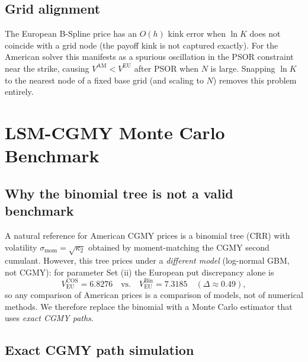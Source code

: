 \documentclass[11pt,a4paper]{article}
\begin{document}
\subsection{Grid alignment}

The European B-Spline price has an $O(h)$ kink error when $\ln K$ does not
coincide with a grid node (the payoff kink is not captured exactly).  For the
American solver this manifests as a spurious oscillation in the PSOR
constraint near the strike, causing $V^{\mathrm{AM}} < V^{\mathrm{EU}}$
after PSOR when $N$ is large.  Snapping $\ln K$ to the nearest node of a
fixed base grid (and scaling to $N$) removes this problem entirely.

\section{LSM-CGMY Monte Carlo Benchmark}
\label{sec:lsm}

\subsection{Why the binomial tree is not a valid benchmark}

A natural reference for American CGMY prices is a binomial tree (CRR) with
volatility $\sigma_{\mathrm{mom}} = \sqrt{\kappa_2}$ obtained by moment-matching
the CGMY second cumulant.  However, this tree prices under a \emph{different
model} (log-normal GBM, not CGMY): for parameter Set (ii) the European put
discrepancy alone is
\[
  V_{\mathrm{EU}}^{\mathrm{COS}} = 6.8276 \quad\text{vs.}\quad
  V_{\mathrm{EU}}^{\mathrm{Bin}} = 7.3185 \quad (\Delta \approx 0.49),
\]
so any comparison of American prices is a comparison of models, not of
numerical methods.  We therefore replace the binomial with a Monte Carlo
estimator that uses \emph{exact CGMY paths}.

\subsection{Exact CGMY path simulation}
\end{document}
